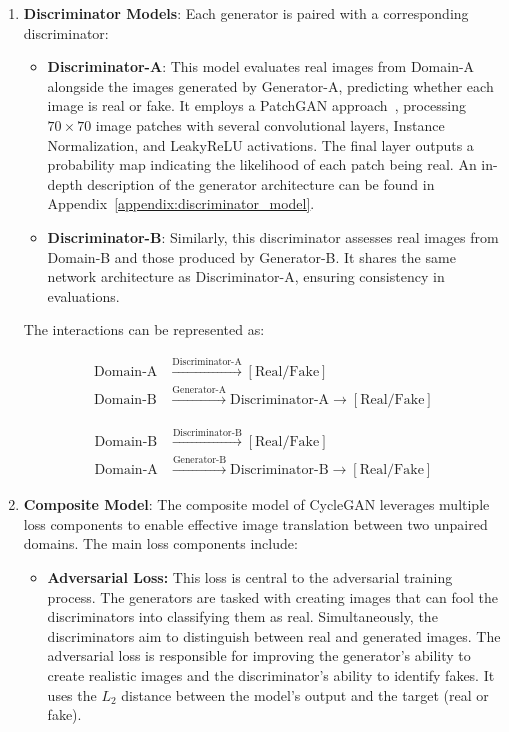 \documentclass[12pt,DIV14,BCOR12mm,a4paper,footinclude=false,headinclude,parskip=half-,twoside,openright,cleardoublepage=empty,toc=index,bibliography=totoc,listof=totoc]{scrreprt}
\numberwithin{equation}{chapter}
\begin{document}
\begin{enumerate}
    \item \textbf{Discriminator Models}:
    Each generator is paired with a corresponding discriminator:
    \begin{itemize}
        \item \textbf{Discriminator-A}: This model evaluates real images from Domain-A alongside the images generated by Generator-A, predicting whether each image is real or fake. It employs a PatchGAN approach~\cite{isola2017image}, processing $70 \times 70$ image patches with several convolutional layers, Instance Normalization, and LeakyReLU activations. The final layer outputs a probability map indicating the likelihood of each patch being real. An in-depth description of the generator architecture can be found in Appendix~\ref{appendix:discriminator_model}. 
        \item \textbf{Discriminator-B}: Similarly, this discriminator assesses real images from Domain-B and those produced by Generator-B. It shares the same network architecture as Discriminator-A, ensuring consistency in evaluations.
    \end{itemize}

    The interactions can be represented as:

    \begin{align*}
    \text{Domain-A} & \xrightarrow{\text{Discriminator-A}} [\text{Real/Fake}] \\
    \text{Domain-B} & \xrightarrow{\text{Generator-A}} \text{Discriminator-A} \xrightarrow{} [\text{Real/Fake}]
    \end{align*}

    \begin{align*}
    \text{Domain-B} & \xrightarrow{\text{Discriminator-B}} [\text{Real/Fake}] \\
    \text{Domain-A} & \xrightarrow{\text{Generator-B}} \text{Discriminator-B} \xrightarrow{} [\text{Real/Fake}]
    \end{align*}

    \item \textbf{Composite Model}: The composite model of CycleGAN leverages multiple loss components to enable effective image translation between two unpaired domains. The main loss components include:

		\begin{itemize}
				\item \textbf{Adversarial Loss:} This loss is central to the adversarial training process. The generators are tasked with creating images that can fool the discriminators into classifying them as real. Simultaneously, the discriminators aim to distinguish between real and generated images. The adversarial loss is responsible for improving the generator’s ability to create realistic images and the discriminator’s ability to identify fakes. It uses the $L_2$ distance between the model's output and the target (real or fake).


\end{itemize}
\end{enumerate}
\end{document}

